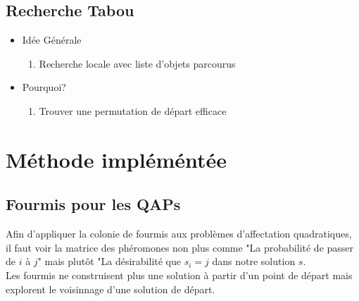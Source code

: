 \documentclass[b]{beamer}
\begin{document}
\subsection{Recherche Tabou}

\begin{frame}

	\begin{itemize}
		\item Idée Générale\\
		\begin{enumerate}
			\item Recherche locale avec liste d'objets parcourus 
		\end{enumerate}
		\item Pourquoi?\\
		\begin{enumerate}
			\item Trouver une permutation de départ efficace
		\end{enumerate}
	\end{itemize}

\end{frame}

\section{Méthode impléméntée}
\subsection{Fourmis pour les QAPs}
\begin{frame}

Afin d'appliquer la colonie de fourmis aux problèmes d'affectation quadratiques, il faut voir la matrice des phéromones non plus comme "La probabilité de passer de $i$ à $j$" mais plutôt "La désirabilité que $s_i=j$ dans notre solution $s$. \\
Les fourmis ne construisent plus une solution à partir d'un point de départ mais explorent le voisinnage d'une solution de départ.\\
\end{frame}
\end{document}
